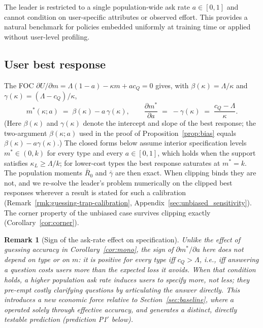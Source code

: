 \documentclass[11pt]{article}
\newtheorem{remark}{Remark}
\begin{document}
The leader is restricted to a single population-wide ask rate $a\in[0,1]$ and
cannot condition on user-specific attributes or observed effort. This provides
a natural benchmark for policies embedded uniformly at training time or applied
without user-level profiling.

\subsection{User best response}

The FOC $\partial U/\partial m = \Lambda(1-a) - \kappa m + ac_Q = 0$ gives, with
$\beta(\kappa)=\Lambda/\kappa$ and $\gamma(\kappa)=(\Lambda-c_Q)/\kappa$,
\[
m^*(\kappa;a) \;=\; \beta(\kappa) - a\,\gamma(\kappa), \qquad
\frac{\partial m^*}{\partial a} \;=\; -\gamma(\kappa) \;=\; \frac{c_Q-\Lambda}{\kappa}.
\]
(Here $\beta(\kappa)$ and $\gamma(\kappa)$ denote the intercept and slope of the best response; the two-argument $\beta(\kappa;a)$ used in the proof of Proposition~\ref{prop:bias} equals $\beta(\kappa) - a\gamma(\kappa)$.) The closed forms below assume interior specification levels $m^* \in (0, k)$ for every type and every $a \in [0,1]$, which holds when the support satisfies $\kappa_L \ge \Lambda/k$; for lower-cost types the best response saturates at $m^* = k$. The population moments $\bar R_0$ and $\bar\gamma$ are then exact. When clipping binds they are not, and we re-solve the leader's problem numerically on the clipped best responses wherever a result is stated for such a calibration (Remark~\ref{rmk:guessing-trap-calibration}, Appendix~\ref{sec:unbiased_sensitivity}). The corner property of the unbiased case survives clipping exactly (Corollary~\ref{cor:corner}).

\begin{remark}[Sign of the ask-rate effect on specification]
Unlike the effect of guessing accuracy in Corollary~\ref{cor:mono}, the sign of $\partial m^*/\partial a$ here does
not depend on type or on $m$: it is positive for \emph{every} type iff $c_Q > \Lambda$, i.e.,
iff answering a question costs users more than the expected loss it avoids. When
that condition holds, a higher population ask rate induces users to specify \emph{more}, not
less; they pre-empt costly clarifying questions by articulating the answer directly.
This introduces a new economic force relative to Section~\ref{sec:baseline},
where $a$ operated solely through effective accuracy, and generates a distinct,
directly testable prediction (prediction P1$'$ below).
\end{remark}
\end{document}
